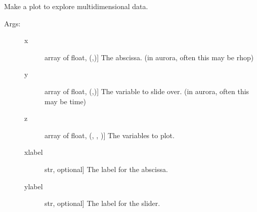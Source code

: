 \documentclass[letterpaper,10pt,english]{sphinxmanual}
\begin{document}
\begin{fulllineitems}
\label{\detokenize{aurora:aurora.plot_tools.get_ls_cycle}}
\end{fulllineitems}


\begin{fulllineitems}
\label{\detokenize{aurora:aurora.plot_tools.slider_plot}}
Make a plot to explore multidimensional data.
\begin{description}
\item[{Args:}] \leavevmode\begin{description}
\item[{x}] \leavevmode{[}array of float, (,){]}
The abscissa. (in aurora, often this may be rhop)

\item[{y}] \leavevmode{[}array of float, (,){]}
The variable to slide over. (in aurora, often this may be time)

\item[{z}] \leavevmode{[}array of float, (, , ){]}
The variables to plot.

\item[{xlabel}] \leavevmode{[}str, optional{]}
The label for the abscissa.

\item[{ylabel}] \leavevmode{[}str, optional{]}
The label for the slider.


\end{description}
\end{description}
\end{fulllineitems}
\end{document}
